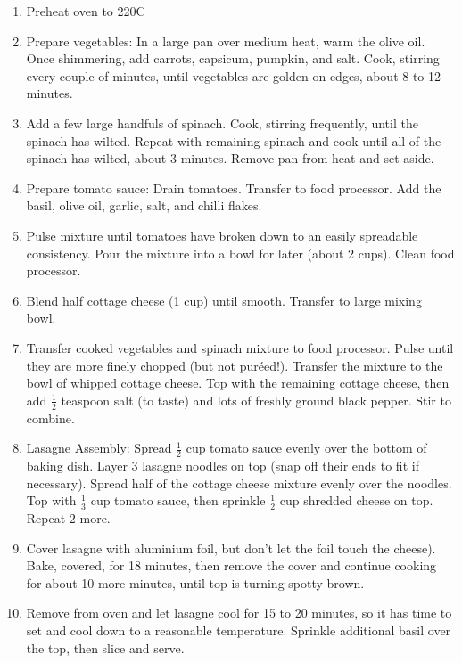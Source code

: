 \documentclass[11pt,a4paper]{article}
\begin{document}
\begin{enumerate}
  \item Preheat oven to 220\textdegree C
  \item Prepare vegetables: In a large pan over medium heat, warm the olive oil. Once shimmering, add carrots, capsicum, pumpkin, and salt. Cook, stirring every couple of minutes, until vegetables are golden on edges, about 8 to 12 minutes.
  \item Add a few large handfuls of spinach. Cook, stirring frequently, until the spinach has wilted. Repeat with remaining spinach and cook until all of the spinach has wilted, about 3 minutes. Remove pan from heat and set aside.
  \item Prepare tomato sauce: Drain tomatoes. Transfer to food processor. Add the basil, olive oil, garlic, salt, and chilli flakes.
  \item Pulse mixture until tomatoes have broken down to an easily spreadable consistency. Pour the mixture into a bowl for later (about 2 cups). Clean food processor.
  \item Blend half cottage cheese (1 cup) until smooth. Transfer to large mixing bowl.
  \item Transfer cooked vegetables and spinach mixture to food processor. Pulse until they are more finely chopped (but not puréed!). Transfer the mixture to the bowl of whipped cottage cheese. Top with the remaining cottage cheese, then add $ \frac {1} {2} $ teaspoon salt (to taste) and lots of freshly ground black pepper. Stir to combine.
  \item Lasagne Assembly: Spread $ \frac {1} {2} $ cup tomato sauce evenly over the bottom of baking dish. Layer 3 lasagne noodles on top (snap off their ends to fit if necessary). Spread half of the cottage cheese mixture evenly over the noodles. Top with $ \frac {1} {3} $ cup tomato sauce, then sprinkle $\frac {1} {2} $ cup shredded cheese on top. Repeat $2$ more.
  \item Cover lasagne with aluminium foil, but don't let the foil touch the cheese). Bake, covered, for 18 minutes, then remove the cover and continue cooking for about 10 more minutes, until top is turning spotty brown.
  \item Remove from oven and let lasagne cool for 15 to 20 minutes, so it has time to set and cool down to a reasonable temperature. Sprinkle additional basil over the top, then slice and serve.
\end{enumerate}
\end{document}

